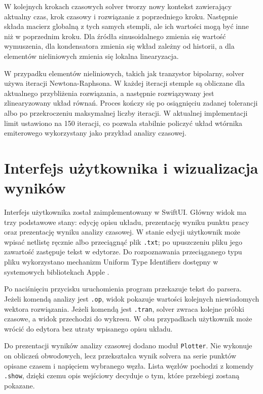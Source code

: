 W kolejnych krokach czasowych solver tworzy nowy kontekst zawierający aktualny czas, krok czasowy i rozwiązanie z poprzedniego kroku. Następnie składa macierz globalną z tych samych stempli, ale ich wartości mogą być inne niż w poprzednim kroku. Dla źródła sinusoidalnego zmienia się wartość wymuszenia, dla kondensatora zmienia się wkład zależny od historii, a dla elementów nieliniowych zmienia się lokalna linearyzacja.

W przypadku elementów nieliniowych, takich jak tranzystor bipolarny, solver używa iteracji Newtona-Raphsona. W każdej iteracji stemple są obliczane dla aktualnego przybliżenia rozwiązania, a następnie rozwiązywany jest zlinearyzowany układ równań. Proces kończy się po osiągnięciu zadanej tolerancji albo po przekroczeniu maksymalnej liczby iteracji. W aktualnej implementacji limit ustawiono na 150 iteracji, co pozwala stabilnie policzyć układ wtórnika emiterowego wykorzystany jako przykład analizy czasowej.

\section{Interfejs użytkownika i wizualizacja wyników}
\label{sec:implementacja-wizualizacja}

Interfejs użytkownika został zaimplementowany w SwiftUI. Główny widok ma trzy podstawowe stany: edycję opisu układu, prezentację wyniku punktu pracy oraz prezentację wyniku analizy czasowej. W stanie edycji użytkownik może wpisać netlistę ręcznie albo przeciągnąć plik \texttt{.txt}; po upuszczeniu pliku jego zawartość zastępuje tekst w edytorze. Do rozpoznawania przeciąganego typu pliku wykorzystano mechanizm Uniform Type Identifiers dostępny w systemowych bibliotekach Apple \cite{swiftui,uniformtypeidentifiers}.

Po naciśnięciu przycisku uruchomienia program przekazuje tekst do parsera. Jeżeli komendą analizy jest \texttt{.op}, widok pokazuje wartości kolejnych niewiadomych wektora rozwiązania. Jeżeli komendą jest \texttt{.tran}, solver zwraca kolejne próbki czasowe, a widok przechodzi do wykresu. W obu przypadkach użytkownik może wrócić do edytora bez utraty wpisanego opisu układu.

Do prezentacji wyników analizy czasowej dodano moduł \texttt{Plotter}. Nie wykonuje on obliczeń obwodowych, lecz przekształca wynik solvera na serie punktów opisane czasem i napięciem wybranego węzła. Lista węzłów pochodzi z komendy \texttt{.show}, dzięki czemu opis wejściowy decyduje o tym, które przebiegi zostaną pokazane.

